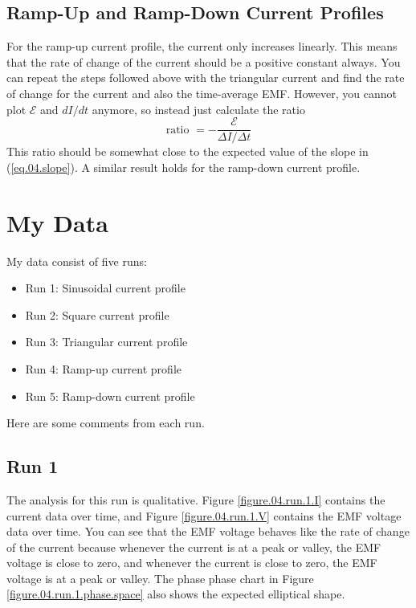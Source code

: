\subsection{Ramp-Up and Ramp-Down Current Profiles}
For the ramp-up current profile, the current only increases linearly. This means that the rate of change of the current should be a positive constant always. You can repeat the steps followed above with the triangular current and find the rate of change for the current and also the time-average EMF. However, you cannot plot $\mathcal{E}$ and $dI/dt$ anymore, so instead just calculate the ratio
\begin{equation}
	\text{ratio } = -\frac{\mathcal{E}}{\Delta I/\Delta t}
	\label{eq.04.ratio}
\end{equation}
This ratio should be somewhat close to the expected value of the slope in (\ref{eq.04.slope}). A similar result holds for the ramp-down current profile.
\section{My Data}
My data consist of five runs:
\begin{itemize}
	\item Run 1: Sinusoidal current profile
	\item Run 2: Square current profile
	\item Run 3: Triangular current profile
	\item Run 4: Ramp-up current profile
	\item Run 5: Ramp-down current profile
\end{itemize}
Here are some comments from each run.
\subsection{Run 1}
The analysis for this run is qualitative. Figure \ref{figure.04.run.1.I} contains the current data over time, and Figure \ref{figure.04.run.1.V} contains the EMF voltage data over time. You can see that the EMF voltage behaves like the rate of change of the current because whenever the current is at a peak or valley, the EMF voltage is close to zero, and whenever the current is close to zero, the EMF voltage is at a peak or valley. The phase phase chart in Figure \ref{figure.04.run.1.phase.space} also shows the expected elliptical shape.
